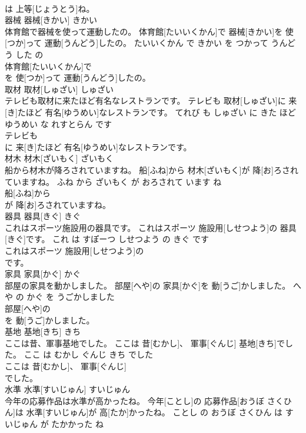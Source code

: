 \documentclass[8pt]{extreport}
\begin{document}
\begin{CJK}{UTF8}{min}
\\	は 上等[じょうとう]ね。			
\\	器械	器械[きかい]	きかい	
\\	体育館で器械を使って運動したの。	体育館[たいいくかん]で 器械[きかい]を 使[つか]って 運動[うんどう]したの。	たいいくかん で きかい を つかって うんどう した の	
\\	体育館[たいいくかん]で
\\	を 使[つか]って 運動[うんどう]したの。			
\\	取材	取材[しゅざい]	しゅざい	
\\	テレビも取材に来たほど有名なレストランです。	テレビも 取材[しゅざい]に 来[き]たほど 有名[ゆうめい]なレストランです。	てれび も しゅざい に きた ほど ゆうめい な れすとらん です	
\\	テレビも
\\	に 来[き]たほど 有名[ゆうめい]なレストランです。			
\\	材木	材木[ざいもく]	ざいもく	
\\	船から材木が降ろされていますね。	船[ふね]から 材木[ざいもく]が 降[お]ろされていますね。	ふね から ざいもく が おろされて います ね	
\\	船[ふね]から
\\	が 降[お]ろされていますね。			
\\	器具	器具[きぐ]	きぐ	
\\	これはスポーツ施設用の器具です。	これはスポーツ 施設用[しせつよう]の 器具[きぐ]です。	これ は すぽーつ しせつよう の きぐ です	
\\	これはスポーツ 施設用[しせつよう]の
\\	です。			
\\	家具	家具[かぐ]	かぐ	
\\	部屋の家具を動かしました。	部屋[へや]の 家具[かぐ]を 動[うご]かしました。	へや の かぐ を うごかしました	
\\	部屋[へや]の
\\	を 動[うご]かしました。			
\\	基地	基地[きち]	きち	
\\	ここは昔、軍事基地でした。	ここは 昔[むかし]、 軍事[ぐんじ] 基地[きち]でした。	ここ は むかし ぐんじ きち でした	
\\	ここは 昔[むかし]、 軍事[ぐんじ]
\\	でした。			
\\	水準	水準[すいじゅん]	すいじゅん	
\\	今年の応募作品は水準が高かったね。	今年[ことし]の 応募作品[おうぼ さくひん]は 水準[すいじゅん]が 高[たか]かったね。	ことし の おうぼ さくひん は すいじゅん が たかかった ね	

\end{CJK}
\end{document}
